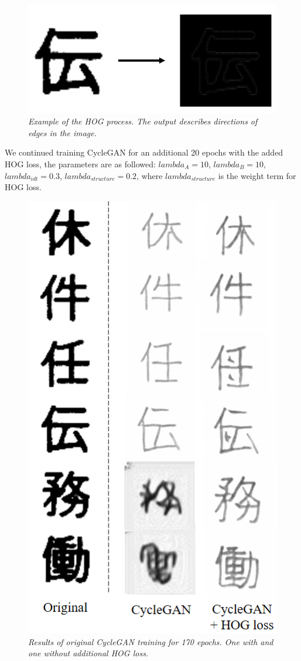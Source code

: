 \documentclass[12pt]{report}
\begin{document}
\begin{figure}[h]
	\centering
	\includegraphics[scale=0.7]{hog}
	\caption{\textit{Example of the HOG process. The output describes directions of edges in the image.}}
	\label{fig:hog}
\end{figure}

We continued training CycleGAN for an additional 20 epochs with the added HOG loss, the parameters are as followed: $lambda_A = 10$, $lambda_B = 10$, $lambda_{idt} = 0.3$, $lambda_{structure} = 0.2$, where $lambda_{structure}$ is the weight term for HOG loss.

\begin{figure}[H]
	\centering
	\includegraphics[scale=0.9]{cycle-gan-result}
	\caption{\textit{Results of original CycleGAN training for 170 epochs. One with and one without additional HOG loss.}}
	\label{fig:cycle-gan-result}
\end{figure}
\end{document}

